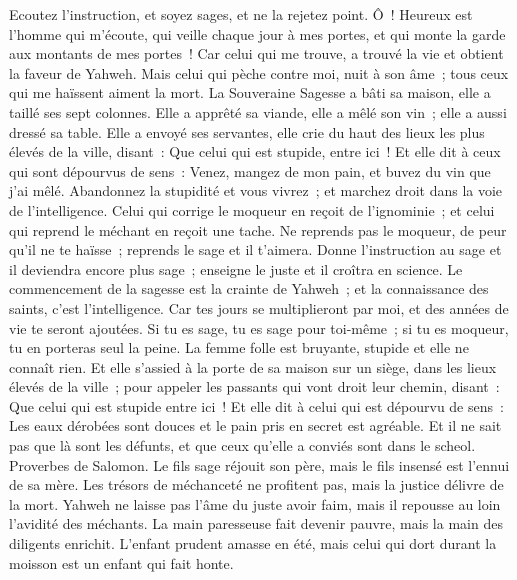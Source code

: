 \begin{multicols}{2}
Ecoutez l'instruction, et soyez sages, et ne la rejetez point.
Ô~! Heureux est l'homme qui m'écoute, qui veille chaque jour à mes portes, et qui monte la garde aux montants de mes portes~!
Car celui qui me trouve, a trouvé la vie et obtient la faveur de Yahweh.
Mais celui qui pèche contre moi, nuit à son âme~; tous ceux qui me haïssent aiment la mort.
\VerseOne{}La Souveraine Sagesse a bâti sa maison, elle a taillé ses sept colonnes.
Elle a apprêté sa viande, elle a mêlé son vin~; elle a aussi dressé sa table.
Elle a envoyé ses servantes, elle crie du haut des lieux les plus élevés de la ville, disant~:
Que celui qui est stupide, entre ici~! Et elle dit à ceux qui sont dépourvus de sens~:
Venez, mangez de mon pain, et buvez du vin que j'ai mêlé.
Abandonnez la stupidité et vous vivrez~; et marchez droit dans la voie de l'intelligence.
Celui qui corrige le moqueur en reçoit de l'ignominie~; et celui qui reprend le méchant en reçoit une tache.
Ne reprends pas le moqueur, de peur qu'il ne te haïsse~; reprends le sage et il t'aimera.
Donne l'instruction au sage et il deviendra encore plus sage~; enseigne le juste et il croîtra en science.
Le commencement de la sagesse est la crainte de Yahweh~; et la connaissance des saints, c'est l'intelligence.
Car tes jours se multiplieront par moi, et des années de vie te seront ajoutées.
Si tu es sage, tu es sage pour toi-même~; si tu es moqueur, tu en porteras seul la peine.
La femme folle est bruyante, stupide et elle ne connaît rien.
Et elle s'assied à la porte de sa maison sur un siège, dans les lieux élevés de la ville~;
pour appeler les passants qui vont droit leur chemin, disant~:
Que celui qui est stupide entre ici~! Et elle dit à celui qui est dépourvu de sens~:
Les eaux dérobées sont douces et le pain pris en secret est agréable.
Et il ne sait pas que là sont les défunts, et que ceux qu'elle a conviés sont dans le scheol.
\VerseOne{}Proverbes de Salomon. Le fils sage réjouit son père, mais le fils insensé est l'ennui de sa mère.
Les trésors de méchanceté ne profitent pas, mais la justice délivre de la mort.
Yahweh ne laisse pas l'âme du juste avoir faim, mais il repousse au loin l'avidité des méchants.
La main paresseuse fait devenir pauvre, mais la main des diligents enrichit.
L'enfant prudent amasse en été, mais celui qui dort durant la moisson est un enfant qui fait honte.

\end{multicols}

